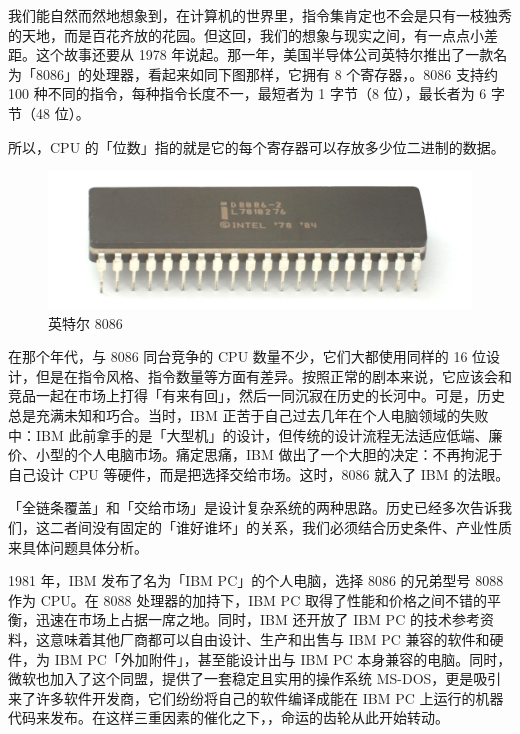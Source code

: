 我们能自然而然地想象到，在计算机的世界里，指令集肯定也不会是只有一枝独秀的天地，而是百花齐放的花园。但这回，我们的想象与现实之间，有一点点小差距。这个故事还要从 1978 年说起。那一年，美国半导体公司英特尔推出了一款名为「8086」的处理器，看起来如同下图那样，它拥有 8 个寄存器，。8086 支持约 100 种不同的指令，每种指令长度不一，最短者为 1 字节（8 位），最长者为 6 字节（48 位）。

\begin{note}
  所以，CPU 的「位数」指的就是它的每个寄存器可以存放多少位二进制的数据。
\end{note}

\begin{figure}[htb!]
  \centering
  \includegraphics[width=.7\textwidth]{assets/surpass/8086.png}
  \caption{英特尔 8086}
  \label{fig:8086}
\end{figure}

在那个年代，与 8086 同台竞争的 CPU 数量不少，它们大都使用同样的 16 位设计，但是在指令风格、指令数量等方面有差异。按照正常的剧本来说，它应该会和竞品一起在市场上打得「有来有回」，然后一同沉寂在历史的长河中。可是，历史总是充满未知和巧合。当时，IBM 正苦于自己过去几年在个人电脑领域的失败中：IBM 此前拿手的是「大型机」的设计，但传统的设计流程无法适应低端、廉价、小型的个人电脑市场。痛定思痛，IBM 做出了一个大胆的决定：不再拘泥于自己设计 CPU 等硬件，而是把选择交给市场。这时，8086 就入了 IBM 的法眼。

\begin{note}
  「全链条覆盖」和「交给市场」是设计复杂系统的两种思路。历史已经多次告诉我们，这二者间没有固定的「谁好谁坏」的关系，我们必须结合历史条件、产业性质来具体问题具体分析。
\end{note}

1981 年，IBM 发布了名为「IBM PC」的个人电脑，选择 8086 的兄弟型号 8088 作为 CPU。在 8088 处理器的加持下，IBM PC 取得了性能和价格之间不错的平衡，迅速在市场上占据一席之地。同时，IBM 还开放了 IBM PC 的技术参考资料，这意味着其他厂商都可以自由设计、生产和出售与 IBM PC 兼容的软件和硬件，为 IBM PC「外加附件」，甚至能设计出与 IBM PC 本身兼容的电脑。同时，微软也加入了这个同盟，提供了一套稳定且实用的操作系统 MS-DOS，更是吸引来了许多软件开发商，它们纷纷将自己的软件编译成能在 IBM PC 上运行的机器代码来发布。在这样三重因素的催化之下，，命运的齿轮从此开始转动。

